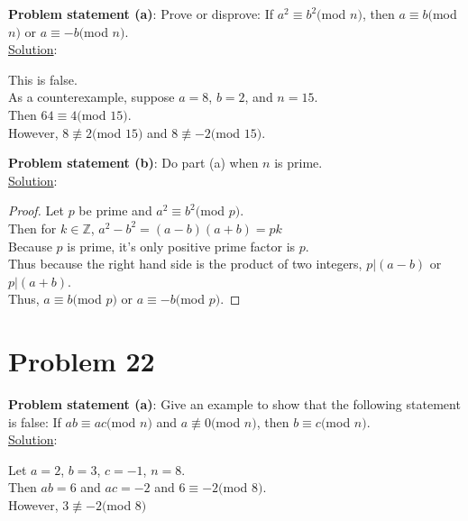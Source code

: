 \documentclass{article} %
\begin{document}
\textbf{Problem statement (a)}: Prove or disprove: If $a^2 \equiv b^2 ($mod $n)$, then $a \equiv b($mod $ n)$ or $a \equiv -b($mod $n)$. 
\\

\underline{Solution}: 
\begin{addmargin}[1em]{0em}
This is false.
\\As a counterexample, suppose $a = 8$, $b = 2$, and $n = 15$.
\\Then $64 \equiv 4 ($mod $ 15)$.
\\However, $8 \not\equiv 2($mod $15)$ and $8 \not\equiv -2($mod $15)$.
\end{addmargin}

\hfill \break

\textbf{Problem statement (b)}: Do part (a) when $n$ is prime. 
\\

\underline{Solution}: 
\begin{addmargin}[1em]{0em}
\begin{proof}
Let $p$ be prime and $a^2 \equiv b^2($mod $p)$.
\\Then for $k \in \mathbb{Z}$, $a^2 - b^2 = (a-b)(a+b) = pk$
\\Because $p$ is prime, it's only positive prime factor is $p$.  
\\Thus because the right hand side is the product of two integers, $p|(a-b)$ or $p|(a+b)$.
\\Thus, $a \equiv b($mod $p)$ or $a \equiv -b($mod $p)$.
\end{proof}
\end{addmargin}

\newpage

\section*{Problem 22}


\textbf{Problem statement (a)}: Give an example to show that the following statement is false: If $ab \equiv ac($mod $n)$ and $a \not\equiv 0 ($mod $n)$, then $b \equiv c($mod $ n)$. 
\\

\underline{Solution}: 
\begin{addmargin}[1em]{0em}
Let $a = 2$, $b = 3$, $c = -1$, $n = 8$.
\\Then $ab = 6$ and $ac = -2$ and $6 \equiv -2 ($mod $8)$.
\\However, $3 \not\equiv -2 ($mod $8)$
\end{addmargin}
\end{document}
